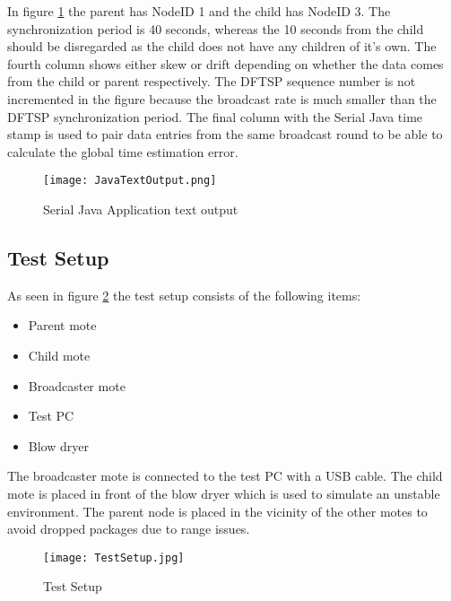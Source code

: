 \documentclass[Main]{subfiles}
\begin{document}
			In figure \ref{fig:JavaTextOutput} the parent has NodeID 1 and the child has NodeID 3.
			The synchronization period is 40 seconds, whereas the 10 seconds from the child should be disregarded as the child does not have any children of it's own.
			The fourth column shows either skew or drift depending on whether the data comes from the child or parent respectively.
			The DFTSP sequence number is not incremented in the figure because the broadcast rate is much smaller than the DFTSP synchronization period.
			The final column with the Serial Java time stamp is used to pair data entries from the same broadcast round to be able to calculate the global time estimation error.

			\begin{figure}[H]
				\centering
				\texttt{[image: JavaTextOutput.png]}
				\caption{Serial Java Application text output}
				\label{fig:JavaTextOutput}
			\end{figure}

			


	\subsection{Test Setup} %
	\label{sub:test_setup}

		As seen in figure \ref{fig:TestSetup} the test setup consists of the following items:

		\begin{itemize}
			\item Parent mote
			\item Child mote
			\item Broadcaster mote
			\item Test PC
			\item Blow dryer 
		\end{itemize}

		The broadcaster mote is connected to the test PC with a USB cable.
		The child mote is placed in front of the blow dryer which is used to simulate an unstable environment.
		The parent node is placed in the vicinity of the other motes to avoid dropped packages due to range issues.

		\begin{figure}[H]
			\centering
			\texttt{[image: TestSetup.jpg]}
			\caption{Test Setup}
			\label{fig:TestSetup}
		\end{figure}
\end{document}
